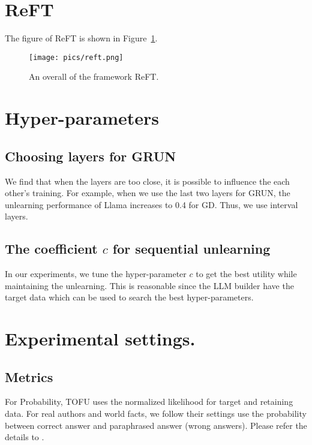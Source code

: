 \newpage

\appendix

\section{ReFT}
\label{appd:reft}

The figure of ReFT is shown in Figure~\ref{fig:reft}.

\begin{figure}[t]
\centering
  \texttt{[image: pics/reft.png]}
  \caption{An overall of the framework ReFT. }
  \label{fig:reft}
  \vspace{-0.1in}
\end{figure}

\section{Hyper-parameters}

\subsection{Choosing layers for GRUN}
\label{appd:layer}

We find that when the layers are too close, it is possible to influence the each other's training. For example, when we use the last two layers for GRUN, the unlearning performance of Llama increases to 0.4 for GD. Thus, we use interval layers.

\subsection{The coefficient $c$ for sequential unlearning}
\label{appd:seq_c}

In our experiments, we tune the hyper-parameter $c$ to get the best utility while maintaining the unlearning. This is reasonable since the LLM builder have the target data which can be used to search the best hyper-parameters.

\section{Experimental settings.}
\label{appd:settings}

\subsection{Metrics}
\label{appd:metrics}

For Probability, TOFU uses the normalized likelihood for target and retaining data. For real authors and world facts, we follow their settings use the probability between correct answer and paraphrased answer (wrong answers). Please refer the details to \citet{maini2024tofu}.

